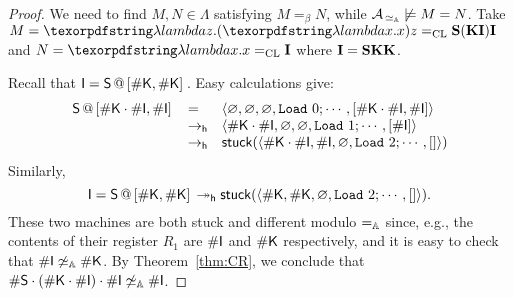 \begin{proof} We need to find $M,N\in\Lambda$ satisfying $M=_\beta N$, while $\mathcal{A}_{\,\simeq_{\mathbb{A}}}\not\models M = N$.
Take $M = \lam z.(\lam x.x)z =_{\CL} \comb{S(KI)I}$ and $N=\lam x.x =_{\CL} \comb{I}$ where ${\mathbf{I}} = {\mathbf{SKK}}$.

Recall that $\mathsf{I} = \mathsf{S\,@\,{[}\# K,\# K{]}\,}$.
Easy calculations give:
\[
	\begin{array}{lll}
	\mathsf{S\,@\,{[}\# \mathsf K\cdot \# \mathsf{I},\# \mathsf{I}{]}\,} &=&
	\langle \varnothing,\varnothing,\varnothing,\mathtt{Load}~0;\cdots,[\# \mathsf K\cdot \# \mathsf{I},\#\mathsf{I}]\rangle\\
	&\to_{\mathsf{h}}&\langle \# \mathsf K\cdot \# \mathsf{I},\varnothing,\varnothing,\mathtt{Load}~1;\cdots,[\#\mathsf{I}]\rangle\\
	&\to_{\mathsf{h}}&\mathsf{stuck}(\langle \# \mathsf K\cdot \# \mathsf{I},\#\mathsf{I},\varnothing,\mathtt{Load}~2;\cdots,[]\rangle)
	\end{array}
\]
Similarly,
\[
	\mathsf{I} = \mathsf{S}\,@\,{[}\#\mathsf K,\#\mathsf K{]}\, \twoheadrightarrow_{\mathsf{h}} \mathsf{stuck}(\langle \#\mathsf{K},\#\mathsf{K},\varnothing,\mathtt{Load}~2;\cdots,[]\rangle).
\]
These two machines are both stuck and different modulo $=_{\mathbb{A}}$ since, e.g., the contents of their register $R_1$ are $\#\mathsf{I}$ and $\#\mathsf{K}$ respectively, and it is easy to check that $\#\mathsf{I}\not\simeq_{\mathbb{A}} \#\mathsf{K}$.
By Theorem~\ref{thm:CR}, we conclude that $ \# \mathsf S\cdot (\#\mathsf K\cdot \#\mathsf{I})\cdot \#\mathsf{I}\not\simeq_{\mathbb{A}}\#\mathsf{I}$.
\end{proof}

